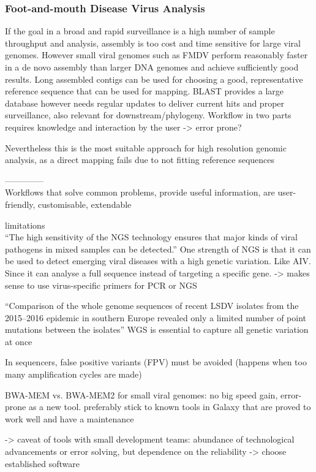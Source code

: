 \subsubsection*{Foot-and-mouth Disease Virus Analysis} 
If the goal in a broad and rapid surveillance is a high number of sample throughput and analysis, assembly is too cost and time sensitive for large viral genomes. However small viral genomes such as FMDV perform reasonably faster in a de novo assembly than larger DNA genomes and achieve sufficiently good results. Long assembled contigs can be used for choosing a good, representative reference sequence that can be used for mapping. BLAST provides a large database however needs regular updates to deliver current hits and proper surveillance, also relevant for downstream/phylogeny.
Workflow in two parts requires knowledge and interaction by the user -> error prone?

Nevertheless this is the most suitable approach for high resolution genomic analysis, as a direct mapping fails due to not fitting reference sequences

--------------\\
Workflows that solve common problems, provide useful information, are user-friendly, customisable, extendable

limitations \\

``The high sensitivity of the \ac{NGS} technology ensures that major kinds of viral pathogens in mixed samples can be detected.''
One strength of \ac{NGS} is that it can be used to detect emerging viral diseases with a high genetic variation. Like \ac{AIV}. Since it can analyse a full sequence instead of targeting a specific gene. -> makes sense to use virus-specific primers for \ac{PCR} or \ac{NGS} 

``Comparison of the whole genome sequences of recent \ac{LSDV} isolates from the 2015–2016 epidemic in southern Europe revealed only a limited number of point mutations between the isolates'' \ac{WGS} is essential to capture all genetic variation at once

In sequencers, false positive variants (\ac{FPV}) must be avoided (happens when too many amplification cycles are made)

BWA-MEM vs. BWA-MEM2 for small viral genomes: no big speed gain, error-prone as a new tool. preferably stick to known tools in Galaxy that are proved to work well and have a maintenance

-> caveat of tools with small development teams: abundance of technological advancements or error solving, but dependence on the reliability -> choose established software

